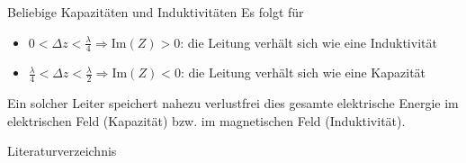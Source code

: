 \documentclass{beamer}
\begin{document}
\begin{frame}{Beliebige Kapazitäten und Induktivitäten}
Es folgt für
\begin{itemize}
    \item $0 < \Delta z < \frac{\lambda}{4} \Rightarrow \mathrm{Im}(Z) > 0$: die Leitung verhält
    sich wie eine Induktivität
    \item $\frac{\lambda}{4} < \Delta z < \frac{\lambda}{2} \Rightarrow \mathrm{Im}(Z) < 0$: die
    Leitung verhält sich wie eine Kapazität
\end{itemize}

Ein solcher Leiter speichert nahezu verlustfrei dies gesamte elektrische Energie
im elektrischen Feld (Kapazität) bzw. im magnetischen Feld (Induktivität).

\end{frame}


\begin{frame}{Literaturverzeichnis}
\printbibliography
\end{frame}
\end{document}
